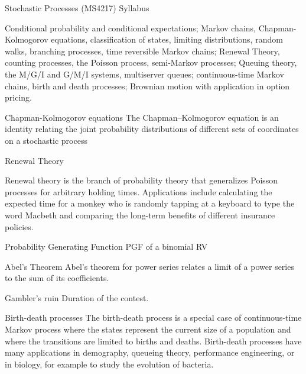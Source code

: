 Stochastic Processes (MS4217)
Syllabus

Conditional probability and conditional expectations; Markov chains, Chapman-Kolmogorov equations, classification of states, limiting distributions, random walks, branching processes, time reversible Markov chains; Renewal Theory, counting processes, the Poisson process, semi-Markov processes; Queuing theory, the M/G/I and G/M/I systems, multiserver queues; continuous-time Markov chains, birth and death processes; Brownian motion with application in option pricing.
 
Chapman-Kolmogorov equations
The Chapman–Kolmogorov equation is an identity relating the joint probability distributions of different sets of coordinates on a stochastic process
 
Renewal Theory
 
Renewal theory is the branch of probability theory that generalizes Poisson processes for arbitrary holding times. Applications include calculating the expected time for a monkey who is randomly tapping at a keyboard to type the word Macbeth and comparing the long-term benefits of different insurance policies.
 
 
Probability Generating Function
    PGF of a binomial RV
 
    Abel's Theorem
        Abel's theorem for power series relates a limit of a power series to the sum of its coefficients.
 
Gambler's ruin
    Duration of the contest.

Birth-death processes
The birth-death process is a special case of continuous-time Markov process where the states represent the current size of a population and where the transitions are limited to births and deaths.
Birth-death processes have many applications in demography, queueing theory, performance engineering, or in biology, for example to study the evolution of bacteria.
 
